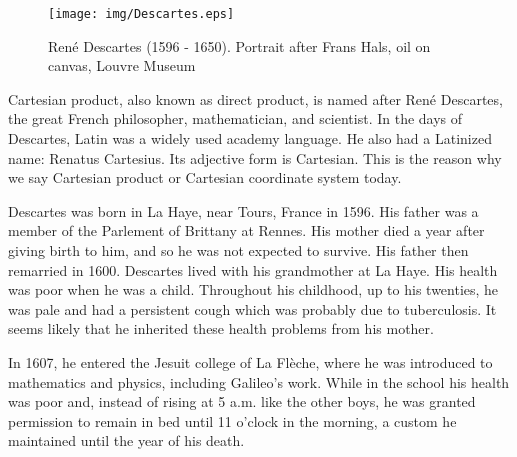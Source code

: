 \documentclass{article}
\begin{document}
\begin{center}
\end{center}

\begin{figure}[htbp]
 \centering
 \texttt{[image: img/Descartes.eps]}
 \captionsetup{labelformat=empty}
 \caption{René Descartes (1596 - 1650). Portrait after Frans Hals, oil on canvas, Louvre Museum}
 \label{fig:Decartes}
\end{figure}

 
Cartesian product, also known as direct product, is named after René Descartes, the great French philosopher, mathematician, and scientist. In the days of Descartes, Latin was a widely used academy language. He also had a Latinized name: Renatus Cartesius. Its adjective form is Cartesian. This is the reason why we say Cartesian product or Cartesian coordinate system today.

Descartes was born in La Haye, near Tours, France in 1596. His father was a member of the Parlement of Brittany at Rennes. His mother died a year after giving birth to him, and so he was not expected to survive. His father then remarried in 1600. Descartes lived with his grandmother at La Haye. His health was poor when he was a child. Throughout his childhood, up to his twenties, he was pale and had a persistent cough which was probably due to tuberculosis. It seems likely that he inherited these health problems from his mother.

In 1607, he entered the Jesuit college of La Flèche, where he was introduced to mathematics and physics, including Galileo's work. While in the school his health was poor and, instead of rising at 5 a.m. like the other boys, he was granted permission to remain in bed until 11 o'clock in the morning, a custom he maintained until the year of his death.
\end{document}
